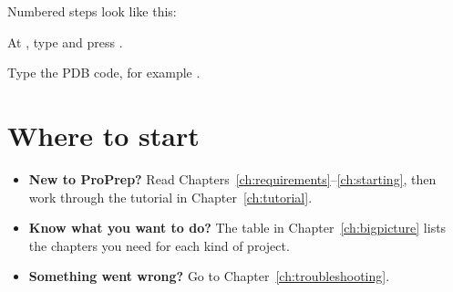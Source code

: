 \begin{glance}
\end{glance}

Numbered steps look like this:

\begin{steps}
  \item At , type  and press .
  \item Type the PDB code, for example .
\end{steps}

\section{Where to start}

\begin{itemize}
  \item \textbf{New to ProPrep?} Read Chapters~\ref{ch:requirements}--\ref{ch:starting},
        then work through the tutorial in Chapter~\ref{ch:tutorial}.
  \item \textbf{Know what you want to do?} The table in Chapter~\ref{ch:bigpicture}
        lists the chapters you need for each kind of project.
  \item \textbf{Something went wrong?} Go to Chapter~\ref{ch:troubleshooting}.
\end{itemize}
